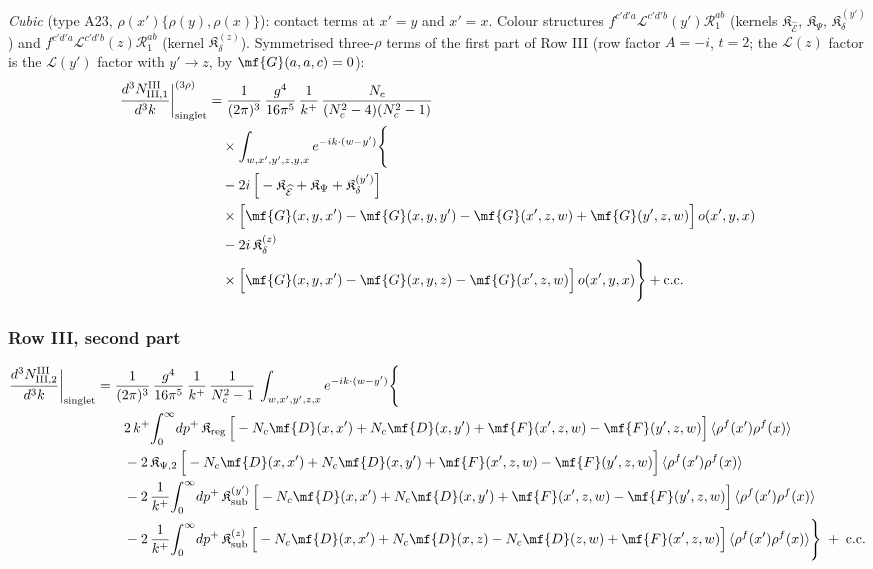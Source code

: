 {\emph{Cubic} (type A23, $\rho(x')\{\rho(y),\rho(x)\}$): contact terms at $x'=y$ and $x'=x$. Colour structures $f^{c'd'a}\mathcal{L}^{c'd'b}(y')\mathcal{R}^{ab}_{1}$ (kernels $\mathfrak{K}_{\widehat{\mathcal{E}}}$, $\mathfrak{K}_{\Psi}$, $\mathfrak{K}_{\delta}^{(y')}$) and $f^{c'd'a}\mathcal{L}^{c'd'b}(z)\mathcal{R}^{ab}_{1}$ (kernel $\mathfrak{K}_{\delta}^{(z)}$).
 Symmetrised three-$\rho$ terms of the first part of Row III (row factor $A=-i$, $t=2$; the $\mathcal{L}(z)$ factor is the $\mathcal{L}(y')$ factor with $y'\to z$, by $\mf{G}(a,a,c)=0$):
\begin{align}
\frac{d^{3}N^{\rm III}_{{\rm III},1}}{d^{3}k}\bigg|^{(3\rho)}_{\rm singlet}&=\frac{1}{(2\pi)^{3}}\,\frac{g^{4}}{16\pi^{5}}\,\frac{1}{k^{+}}\,\frac{N_{c}}{(N_{c}^{2}-4)(N_{c}^{2}-1)}\notag\\
&\quad\times\int_{w,x',y',z,y,x}e^{-ik\cdot(w-y')}\Bigg\{\notag\\
&\quad-2i\,\Big[-\mathfrak{K}_{\widehat{\mathcal{E}}}+\mathfrak{K}_{\Psi}+\mathfrak{K}_{\delta}^{(y')}\Big]\notag\\
&\quad\times\Big[\mf{G}(x,y,x')-\mf{G}(x,y,y')-\mf{G}(x',z,w)+\mf{G}(y',z,w)\Big]\,o(x',y,x)\notag\\
&\quad-2i\,\mathfrak{K}_{\delta}^{(z)}\notag\\
&\quad\times\Big[\mf{G}(x,y,x')-\mf{G}(x,y,z)-\mf{G}(x',z,w)\Big]\,o(x',y,x)\Bigg\}+{\rm c.c.}\label{eq:s-o-III-III-1}
\end{align}

\subsubsection*{Row III, second part}

\begin{align}
\frac{d^{3}N^{\rm III}_{{\rm III},2}}{d^{3}k}\bigg|_{\rm singlet}&=\frac{1}{(2\pi)^{3}}\,\frac{g^{4}}{16\pi^{5}}\,\frac{1}{k^{+}}\,\frac{1}{N_{c}^{2}-1}\,\int_{w,x',y',z,x}e^{-ik\cdot(w-y')}\Bigg\{\notag\\
&\qquad 2\,k^{+}\!\int_{0}^{\infty}\!dp^{+}\,\mathfrak{K}_{\rm reg}\,\Big[-N_{c}\mf{D}(x,x')+N_{c}\mf{D}(x,y')+\mf{F}(x',z,w)-\mf{F}(y',z,w)\Big]\,\langle\rho^{f}(x')\rho^{f}(x)\rangle\notag\\
&\qquad -2\,\mathfrak{K}_{\Psi,2}\,\Big[-N_{c}\mf{D}(x,x')+N_{c}\mf{D}(x,y')+\mf{F}(x',z,w)-\mf{F}(y',z,w)\Big]\,\langle\rho^{f}(x')\rho^{f}(x)\rangle\notag\\
&\qquad -2\,\frac{1}{k^{+}}\!\int_{0}^{\infty}\!dp^{+}\,\mathfrak{K}_{\rm sub}^{(y')}\,\Big[-N_{c}\mf{D}(x,x')+N_{c}\mf{D}(x,y')+\mf{F}(x',z,w)-\mf{F}(y',z,w)\Big]\,\langle\rho^{f}(x')\rho^{f}(x)\rangle\notag\\
&\qquad -2\,\frac{1}{k^{+}}\!\int_{0}^{\infty}\!dp^{+}\,\mathfrak{K}_{\rm sub}^{(z)}\,\Big[-N_{c}\mf{D}(x,x')+N_{c}\mf{D}(x,z)-N_{c}\mf{D}(z,w)+\mf{F}(x',z,w)\Big]\,\langle\rho^{f}(x')\rho^{f}(x)\rangle\Bigg\}\;+\;{\rm c.c.}\label{eq:s-III-III-2}
\end{align}

}
